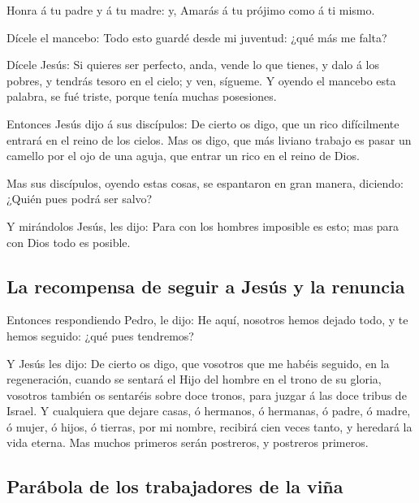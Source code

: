  Honra á tu padre y á tu madre: y, Amarás á tu prójimo como
á ti mismo.

 Dícele el mancebo: Todo esto guardé desde mi juventud:
¿qué más me falta?

 Dícele Jesús: Si quieres ser perfecto, anda, vende lo que
tienes, y dalo á los pobres, y tendrás tesoro en el cielo; y ven,
sígueme.  Y oyendo el mancebo esta palabra, se fué triste,
porque tenía muchas posesiones.

 Entonces Jesús dijo á sus discípulos: De cierto os digo,
que un rico difícilmente entrará en el reino de los cielos.
 Mas os digo, que más liviano trabajo es pasar un camello
por el ojo de una aguja, que entrar un rico en el reino de Dios.

 Mas sus discípulos, oyendo estas cosas, se espantaron en
gran manera, diciendo: ¿Quién pues podrá ser salvo?

 Y mirándolos Jesús, les dijo: Para con los hombres
imposible es esto; mas para con Dios todo es posible.

\hypertarget{la-recompensa-de-seguir-a-jesuxfas-y-la-renuncia}{%
\subsection{La recompensa de seguir a Jesús y la
renuncia}\label{la-recompensa-de-seguir-a-jesuxfas-y-la-renuncia}}

 Entonces respondiendo Pedro, le dijo: He aquí, nosotros
hemos dejado todo, y te hemos seguido: ¿qué pues tendremos?

 Y Jesús les dijo: De cierto os digo, que vosotros que me
habéis seguido, en la regeneración, cuando se sentará el Hijo del hombre
en el trono de su gloria, vosotros también os sentaréis sobre doce
tronos, para juzgar á las doce tribus de Israel.  Y
cualquiera que dejare casas, ó hermanos, ó hermanas, ó padre, ó madre, ó
mujer, ó hijos, ó tierras, por mi nombre, recibirá cien veces tanto, y
heredará la vida eterna.  Mas muchos primeros serán
postreros, y postreros primeros.

\hypertarget{paruxe1bola-de-los-trabajadores-de-la-viuxf1a}{%
\subsection{Parábola de los trabajadores de la
viña}\label{paruxe1bola-de-los-trabajadores-de-la-viuxf1a}}

